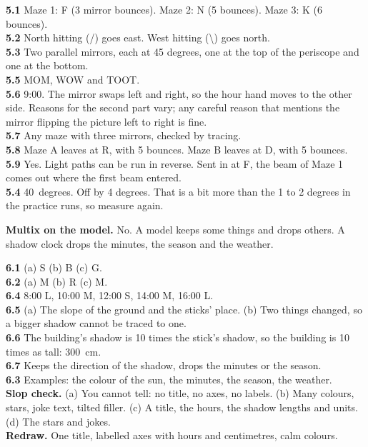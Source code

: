 \textbf{5.1} Maze 1: F (3 mirror bounces). Maze 2: N (5 bounces). Maze 3: K (6 bounces).\\
\textbf{5.2} North hitting (/) goes east. West hitting (\textbackslash) goes north.\\
\textbf{5.3} Two parallel mirrors, each at 45 degrees, one at the top of the periscope and one at the bottom.\\
\textbf{5.5} MOM, WOW and TOOT.\\
\textbf{5.6} 9:00. The mirror swaps left and right, so the hour hand moves to the other side. Reasons for the second part vary; any careful reason that mentions the mirror flipping the picture left to right is fine.\\
\textbf{5.7} Any maze with three mirrors, checked by tracing.\\
\textbf{5.8} Maze A leaves at R, with 5 bounces. Maze B leaves at D, with 5 bounces.\\
\textbf{5.9} Yes. Light paths can be run in reverse. Sent in at F, the beam of Maze 1 comes out where the first beam entered.\\
\textbf{5.4} 40~degrees. Off by 4 degrees. That is a bit more than the 1 to 2 degrees in the practice runs, so measure again.

\textbf{Multix on the model.} No. A model keeps some things and drops others. A shadow clock drops the minutes, the season and the weather.

\textbf{6.1} (a) S (b) B (c) G.\\
\textbf{6.2} (a) M (b) R (c) M.\\
\textbf{6.4} 8:00 L, 10:00 M, 12:00 S, 14:00 M, 16:00 L.\\
\textbf{6.5} (a) The slope of the ground and the sticks' place. (b) Two things changed, so a bigger shadow cannot be traced to one.\\
\textbf{6.6} The building's shadow is 10 times the stick's shadow, so the building is 10 times as tall: 300~cm.\\
\textbf{6.7} Keeps the direction of the shadow, drops the minutes or the season.\\
\textbf{6.3} Examples: the colour of the sun, the minutes, the season, the weather.\\
\textbf{Slop check.} (a) You cannot tell: no title, no axes, no labels. (b) Many colours, stars, joke text, tilted filler. (c) A title, the hours, the shadow lengths and units. (d) The stars and jokes.\\
\textbf{Redraw.} One title, labelled axes with hours and centimetres, calm colours.

